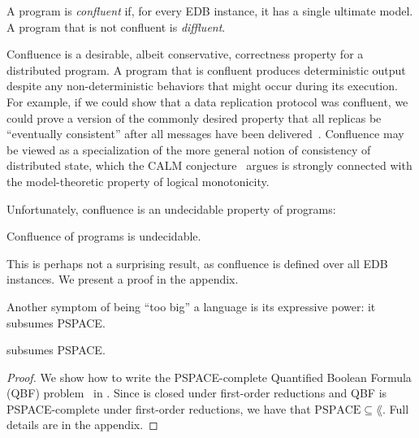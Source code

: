 \begin{definition}
  A \lang program is {\em confluent} if, for every EDB instance, it has a single ultimate model.  A program that is not confluent is {\em diffluent}.
\end{definition}


Confluence is a desirable, albeit conservative, correctness property for a
distributed program.  A program that is confluent produces deterministic output
despite any non-deterministic behaviors that might occur during its
execution. For example, if we could show that a data replication protocol was
confluent, we could prove a version of the commonly desired property that all
replicas be ``eventually consistent'' after all messages have been
delivered~\cite{bayou,vogels-ec}.  Confluence may be viewed as a specialization of the
more general notion of consistency of distributed state, which the CALM
conjecture~\cite{declarative-imperative} argues is strongly connected with the
model-theoretic property of logical monotonicity.

Unfortunately, confluence is an undecidable property of \lang programs:

\begin{lemma}
\label{lem:confluence-undecidable}
Confluence of \lang programs is undecidable.
\end{lemma}
This is perhaps not a surprising result, as confluence is defined over all EDB instances.  We present a proof in the appendix.


Another symptom of \lang being ``too big'' a language is its expressive power: it subsumes PSPACE.  

\begin{lemma}
\label{lem:lang-pspace}
\lang %
subsumes PSPACE.
\end{lemma}

\begin{proof}

We show how to write the PSPACE-complete Quantified Boolean Formula (QBF) problem~\cite{garey-johnson} in \lang. Since \lang is closed under first-order reductions and QBF is PSPACE-complete under first-order reductions, we have that $\text{PSPACE} \subseteq \lang$.  Full details are in the appendix.
\end{proof}

